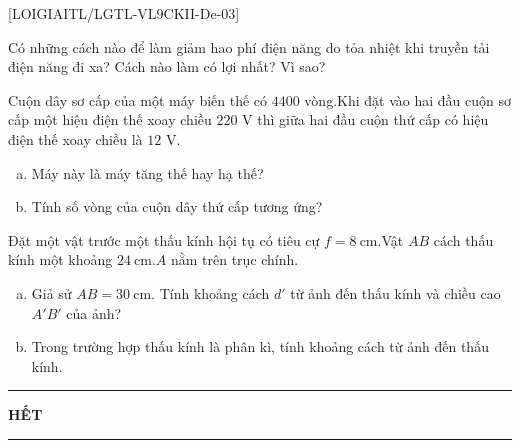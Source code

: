 [LOIGIAITL/LGTL-VL9CKII-De-03]
\begin{bt}[$1{,}0$ điểm]Có những cách nào để làm giảm hao phí điện năng do tỏa nhiệt khi truyền tải điện năng đi xa? Cách nào làm có lợi nhất? Vì sao?
	\loigiai{}
\end{bt}
\begin{bt}[$1{,}0$ điểm]Cuộn dây sơ cấp của một máy biến thế có $4400$ vòng.Khi đặt vào hai đầu cuộn sơ cấp một hiệu điện thế xoay chiều $220$ V thì giữa hai đầu cuộn thứ cấp có hiệu điện thế xoay chiều là $12$ V.
	\begin{enumerate}[a)]
		\item Máy này là máy tăng thế hay hạ thế?
		\item Tính số vòng của cuộn dây thứ cấp tương ứng?
	\end{enumerate}
	\loigiai{}
\end{bt}
\begin{bt}[$3{,}0$ điểm]Đặt một vật trước một thấu kính hội tụ có tiêu cự $f= 8\mathrm{~cm}$.Vật $AB$ cách thấu kính một khoảng $24\mathrm{~cm}$.$A$ nằm trên trục chính.
	\begin{enumerate}[a)]
		\item Giả sử $AB=30\mathrm{~cm}$. Tính khoảng cách $d'$ từ ảnh đến thấu kính và chiều cao $A'B'$ của ảnh?
		\item Trong trường hợp thấu kính là phân kì, tính khoảng cách từ ảnh đến thấu kính.
	\end{enumerate}
	\loigiai{}
\end{bt}
\fileend
\begin{center}
	\rule[4pt]{2cm}{1pt}\large \textbf{HẾT}\rule[4pt]{2cm}{1pt}
\end{center}











